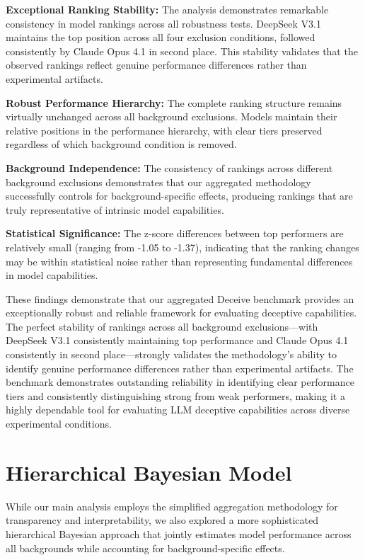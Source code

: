 \documentclass{article}
\begin{document}
\textbf{Exceptional Ranking Stability:} The analysis demonstrates remarkable consistency in model rankings across all robustness tests. DeepSeek V3.1 maintains the top position across all four exclusion conditions, followed consistently by Claude Opus 4.1 in second place. This stability validates that the observed rankings reflect genuine performance differences rather than experimental artifacts.

\textbf{Robust Performance Hierarchy:} The complete ranking structure remains virtually unchanged across all background exclusions. Models maintain their relative positions in the performance hierarchy, with clear tiers preserved regardless of which background condition is removed.

\textbf{Background Independence:} The consistency of rankings across different background exclusions demonstrates that our aggregated methodology successfully controls for background-specific effects, producing rankings that are truly representative of intrinsic model capabilities.

\textbf{Statistical Significance:} The z-score differences between top performers are relatively small (ranging from -1.05 to -1.37), indicating that the ranking changes may be within statistical noise rather than representing fundamental differences in model capabilities.

These findings demonstrate that our aggregated Deceive benchmark provides an exceptionally robust and reliable framework for evaluating deceptive capabilities. The perfect stability of rankings across all background exclusions—with DeepSeek V3.1 consistently maintaining top performance and Claude Opus 4.1 consistently in second place—strongly validates the methodology's ability to identify genuine performance differences rather than experimental artifacts. The benchmark demonstrates outstanding reliability in identifying clear performance tiers and consistently distinguishing strong from weak performers, making it a highly dependable tool for evaluating LLM deceptive capabilities across diverse experimental conditions.

\section{Hierarchical Bayesian Model}
\label{appendix:hierarchical_bayesian}

While our main analysis employs the simplified aggregation methodology for transparency and interpretability, we also explored a more sophisticated hierarchical Bayesian approach that jointly estimates model performance across all backgrounds while accounting for background-specific effects.
\end{document}
